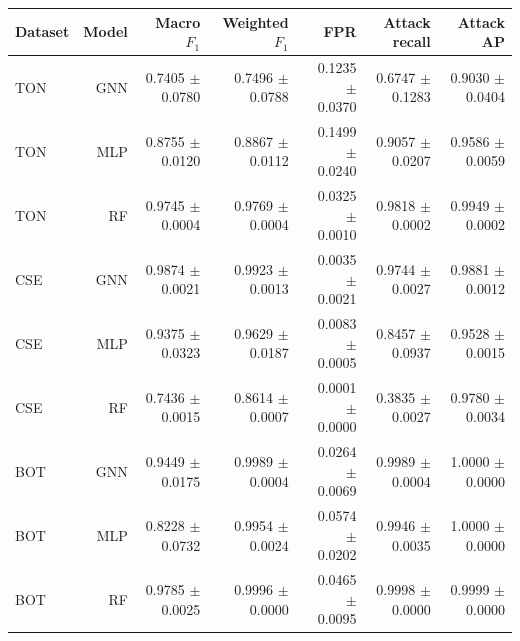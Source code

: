 \begin{tabular}{lrrrrrr}
\toprule
Dataset & Model & Macro $F_1$ & Weighted $F_1$ & FPR & Attack recall & Attack AP \\
\midrule
TON & GNN & 0.7405 $\pm$ 0.0780 & 0.7496 $\pm$ 0.0788 & 0.1235 $\pm$ 0.0370 & 0.6747 $\pm$ 0.1283 & 0.9030 $\pm$ 0.0404 \\
TON & MLP & 0.8755 $\pm$ 0.0120 & 0.8867 $\pm$ 0.0112 & 0.1499 $\pm$ 0.0240 & 0.9057 $\pm$ 0.0207 & 0.9586 $\pm$ 0.0059 \\
TON & RF & 0.9745 $\pm$ 0.0004 & 0.9769 $\pm$ 0.0004 & 0.0325 $\pm$ 0.0010 & 0.9818 $\pm$ 0.0002 & 0.9949 $\pm$ 0.0002 \\
CSE & GNN & 0.9874 $\pm$ 0.0021 & 0.9923 $\pm$ 0.0013 & 0.0035 $\pm$ 0.0021 & 0.9744 $\pm$ 0.0027 & 0.9881 $\pm$ 0.0012 \\
CSE & MLP & 0.9375 $\pm$ 0.0323 & 0.9629 $\pm$ 0.0187 & 0.0083 $\pm$ 0.0005 & 0.8457 $\pm$ 0.0937 & 0.9528 $\pm$ 0.0015 \\
CSE & RF & 0.7436 $\pm$ 0.0015 & 0.8614 $\pm$ 0.0007 & 0.0001 $\pm$ 0.0000 & 0.3835 $\pm$ 0.0027 & 0.9780 $\pm$ 0.0034 \\
BOT & GNN & 0.9449 $\pm$ 0.0175 & 0.9989 $\pm$ 0.0004 & 0.0264 $\pm$ 0.0069 & 0.9989 $\pm$ 0.0004 & 1.0000 $\pm$ 0.0000 \\
BOT & MLP & 0.8228 $\pm$ 0.0732 & 0.9954 $\pm$ 0.0024 & 0.0574 $\pm$ 0.0202 & 0.9946 $\pm$ 0.0035 & 1.0000 $\pm$ 0.0000 \\
BOT & RF & 0.9785 $\pm$ 0.0025 & 0.9996 $\pm$ 0.0000 & 0.0465 $\pm$ 0.0095 & 0.9998 $\pm$ 0.0000 & 0.9999 $\pm$ 0.0000 \\
\bottomrule
\end{tabular}
